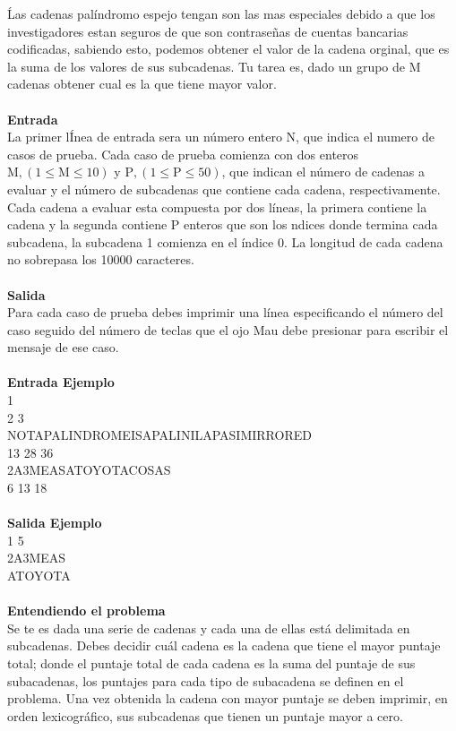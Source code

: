 \documentclass[12pt]{article}
\begin{document}
\'Las cadenas pal\'indromo espejo tengan son las mas especiales debido a que los investigadores estan seguros de que son contraseñas de cuentas bancarias codificadas, sabiendo esto, podemos obtener el valor de la cadena orginal, que es la suma de los valores de sus subcadenas.
Tu tarea es, dado un grupo de $\mathrm{M}$ cadenas obtener cual es la que tiene mayor valor.\\
\\
\textbf{\large Entrada}
\\La primer l\'Inea de entrada sera un n\'umero entero N, que indica el numero de casos de prueba. Cada caso de
prueba comienza con dos enteros $\mathrm{M, (1 \leq M \leq 10)}$ y $\mathrm{P, (1 \leq P \leq 50)}$, que indican el n\'umero de cadenas a evaluar
y el n\'umero de subcadenas que contiene cada cadena, respectivamente. Cada cadena a evaluar esta compuesta por
dos l\'ineas, la primera contiene la cadena y la segunda contiene $\mathrm{P}$ enteros que son los ndices donde termina cada
subcadena, la subcadena 1 comienza en el \'indice 0. La longitud de cada cadena no sobrepasa los 10000 caracteres.\\
\\
\textbf{\large Salida}
\\Para cada caso de prueba debes imprimir una l\'inea especificando el n\'umero del caso seguido del n\'umero de teclas que el ojo Mau debe presionar para escribir el mensaje de ese caso.\\
\\
\textbf{\large Entrada Ejemplo}
\\1\\
2 3\\
NOTAPALINDROMEISAPALINILAPASIMIRRORED\\
13 28 36\\
2A3MEASATOYOTACOSAS\\
6 13 18\\
\\
\textbf{\large Salida Ejemplo}
\\1 5\\
2A3MEAS\\
ATOYOTA\\
\\
\textbf{\large Entendiendo el problema}\\
Se te es dada una serie de cadenas y cada una de ellas está delimitada en subcadenas. Debes decidir cuál cadena es la 
cadena que tiene el mayor puntaje total; donde el puntaje total de 
cada cadena es la suma del puntaje de sus subacadenas, los 
puntajes para cada tipo de subacadena se definen en el problema. Una vez obtenida la cadena con mayor puntaje se deben imprimir, en orden lexicográfico, sus subcadenas que tienen un puntaje mayor a cero.\\
\end{document}
